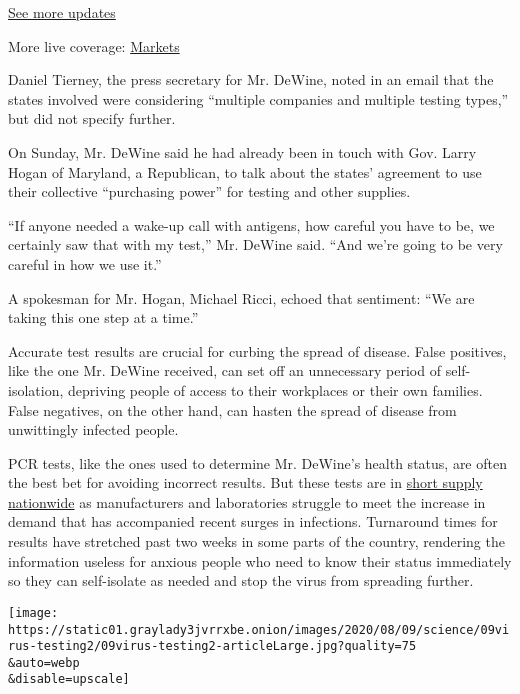 \href{https://www.nytimes3xbfgragh.onion/2020/08/21/world/covid-19-coronavirus.html?action=click\&pgtype=Article\&state=default\&region=MAIN_CONTENT_1\&context=storylines_live_updates}{See
more updates}

More live coverage:
\href{https://www.nytimes3xbfgragh.onion/live/2020/08/21/business/stock-market-today-coronavirus?action=click\&pgtype=Article\&state=default\&region=MAIN_CONTENT_1\&context=storylines_live_updates}{Markets}

Daniel Tierney, the press secretary for Mr. DeWine, noted in an email
that the states involved were considering ``multiple companies and
multiple testing types,'' but did not specify further.

On Sunday, Mr. DeWine said he had already been in touch with Gov. Larry
Hogan of Maryland, a Republican, to talk about the states' agreement to
use their collective ``purchasing power'' for testing and other
supplies.

``If anyone needed a wake-up call with antigens, how careful you have to
be, we certainly saw that with my test,'' Mr. DeWine said. ``And we're
going to be very careful in how we use it.''

A spokesman for Mr. Hogan, Michael Ricci, echoed that sentiment: ``We
are taking this one step at a time.''

Accurate test results are crucial for curbing the spread of disease.
False positives, like the one Mr. DeWine received, can set off an
unnecessary period of self-isolation, depriving people of access to
their workplaces or their own families. False negatives, on the other
hand, can hasten the spread of disease from unwittingly infected people.

PCR tests, like the ones used to determine Mr. DeWine's health status,
are often the best bet for avoiding incorrect results. But these tests
are in
\href{https://www.nytimes3xbfgragh.onion/2020/07/23/health/coronavirus-testing-supply-shortage.html}{short
supply nationwide} as manufacturers and laboratories struggle to meet
the increase in demand that has accompanied recent surges in infections.
Turnaround times for results have stretched past two weeks in some parts
of the country, rendering the information useless for anxious people who
need to know their status immediately so they can self-isolate as needed
and stop the virus from spreading further.

\texttt{[image: https://static01.graylady3jvrrxbe.onion/images/2020/08/09/science/09virus-testing2/09virus-testing2-articleLarge.jpg?quality=75\\\&auto=webp\\\&disable=upscale]}

